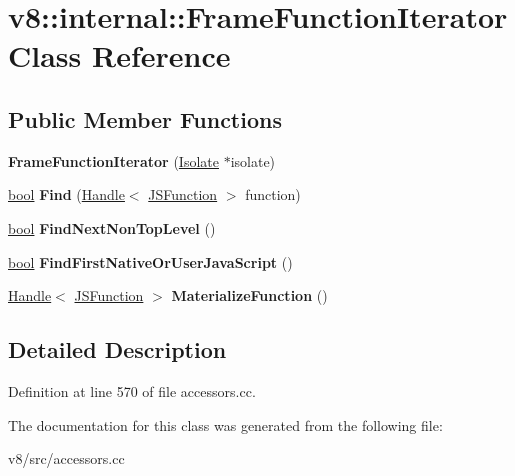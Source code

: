 \hypertarget{classv8_1_1internal_1_1FrameFunctionIterator}{}\section{v8\+:\+:internal\+:\+:Frame\+Function\+Iterator Class Reference}
\label{classv8_1_1internal_1_1FrameFunctionIterator}
\subsection*{Public Member Functions}
\begin{DoxyCompactItemize}
\item 
\mbox{\label{classv8_1_1internal_1_1FrameFunctionIterator_ad58ad8f36409c74e37ca5d5092a344d2}} 
{\bfseries Frame\+Function\+Iterator} (\mbox{\hyperlink{classv8_1_1internal_1_1Isolate}{Isolate}} $\ast$isolate)
\item 
\mbox{\label{classv8_1_1internal_1_1FrameFunctionIterator_a9c1d358b90103b3c2183767f94593b0c}} 
\mbox{\hyperlink{classbool}{bool}} {\bfseries Find} (\mbox{\hyperlink{classv8_1_1internal_1_1Handle}{Handle}}$<$ \mbox{\hyperlink{classv8_1_1internal_1_1JSFunction}{J\+S\+Function}} $>$ function)
\item 
\mbox{\label{classv8_1_1internal_1_1FrameFunctionIterator_af760b3c7285c7d1e77777b55fd4618dd}} 
\mbox{\hyperlink{classbool}{bool}} {\bfseries Find\+Next\+Non\+Top\+Level} ()
\item 
\mbox{\label{classv8_1_1internal_1_1FrameFunctionIterator_ad92a26ae42f94297412ecea81053682f}} 
\mbox{\hyperlink{classbool}{bool}} {\bfseries Find\+First\+Native\+Or\+User\+Java\+Script} ()
\item 
\mbox{\label{classv8_1_1internal_1_1FrameFunctionIterator_abfe766616558e200c140ebf8279e4fef}} 
\mbox{\hyperlink{classv8_1_1internal_1_1Handle}{Handle}}$<$ \mbox{\hyperlink{classv8_1_1internal_1_1JSFunction}{J\+S\+Function}} $>$ {\bfseries Materialize\+Function} ()
\end{DoxyCompactItemize}


\subsection{Detailed Description}


Definition at line 570 of file accessors.\+cc.



The documentation for this class was generated from the following file\+:\begin{DoxyCompactItemize}
\item 
v8/src/accessors.\+cc\end{DoxyCompactItemize}
